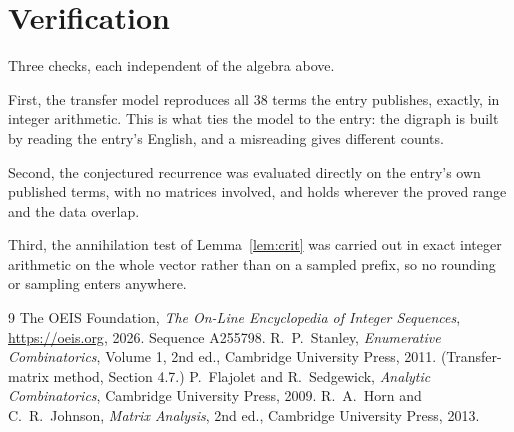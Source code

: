\documentclass[11pt,a4paper]{article}
\theoremstyle{plain}
\theoremstyle{definition}
\begin{document}
\section{Verification}

Three checks, each independent of the algebra above.

First, the transfer model reproduces all $38$ terms the entry publishes, exactly, in
integer arithmetic. This is what ties the model to the entry: the digraph is built by reading
the entry's English, and a misreading gives different counts.

Second, the conjectured recurrence was evaluated directly on the entry's own published terms,
with no matrices involved, and holds wherever the proved range and the data overlap.

Third, the annihilation test of Lemma~\ref{lem:crit} was carried out in exact integer
arithmetic on the whole vector rather than on a sampled prefix, so no rounding or sampling
enters anywhere.

\begin{thebibliography}{9}
 The OEIS Foundation, \emph{The On-Line Encyclopedia of Integer
Sequences}, \url{https://oeis.org}, 2026. Sequence A255798.
 R.~P.~Stanley, \emph{Enumerative Combinatorics}, Volume 1, 2nd ed.,
Cambridge University Press, 2011. (Transfer-matrix method, Section 4.7.)
 P.~Flajolet and R.~Sedgewick, \emph{Analytic Combinatorics}, Cambridge
University Press, 2009.
 R.~A.~Horn and C.~R.~Johnson, \emph{Matrix Analysis}, 2nd ed., Cambridge
University Press, 2013.
\end{thebibliography}
\end{document}
